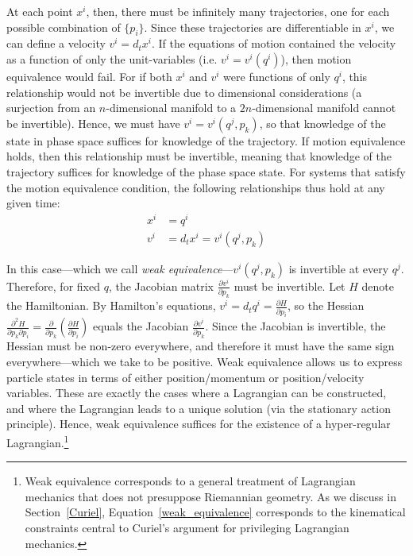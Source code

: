 \documentclass[12pt, english, twoside]{article} %
\begin{document}
At each point $x^i$, then, there must be infinitely many trajectories, one for each possible combination of $\{p_i\}$. Since these trajectories are differentiable in $x^i$, we can define a velocity $v^i = d_t x^i$. If the equations of motion contained the velocity as a function of only the unit-variables (i.e. $v^i=v^i(q^i)$), then motion equivalence would fail. For if both $x^i$ and $v^i$ were functions of only $q^i$, this relationship would not be invertible due to dimensional considerations (a surjection from an $n$-dimensional manifold to a $2n$-dimensional manifold cannot be invertible). Hence, we must have $v^i=v^i(q^j, p_k)$, so that knowledge of the state in phase space suffices for knowledge of the trajectory. If motion equivalence holds, then this relationship must be invertible, meaning that knowledge of the trajectory suffices for knowledge of the phase space state. For systems that satisfy the motion equivalence condition, the following relationships thus hold at any given time:
\begin{equation}\label{weak_equivalence}
\begin{aligned}
x^i &= q^i \\
v^i &= d_t x^i = v^i(q^j, p_k)
\end{aligned}
\end{equation}

In this case---which we call \textit{weak equivalence}---$v^i(q^j, p_k)$ is invertible at every $q^j$. Therefore, for fixed $q$, the Jacobian matrix  $\frac{\partial v^i}{\partial p_k}$ must be invertible. Let $H$ denote the Hamiltonian. By Hamilton's equations, $v^i = d_t q^i = \frac{\partial H}{\partial p_i}$, so the Hessian $\frac{\partial^2 H}{\partial p_k \partial p_i} = \frac{\partial}{\partial p_k} (\frac{\partial H}{\partial p_i})$ equals the Jacobian $\frac{\partial v^i}{\partial p_k}$. Since the Jacobian is invertible, the Hessian must be non-zero everywhere, and therefore it must have the same sign everywhere---which we take to be positive. Weak equivalence allows us to express particle states in terms of either position/momentum or position/velocity variables. These are exactly the cases where a Lagrangian can be constructed, and where the Lagrangian leads to a unique solution (via the stationary action principle). Hence, weak equivalence suffices for the existence of a hyper-regular Lagrangian.\footnote{Weak equivalence corresponds to a general treatment of Lagrangian mechanics that does not presuppose Riemannian geometry. As we discuss in Section~\ref{Curiel}, Equation~\ref{weak_equivalence} corresponds to the kinematical constraints central to Curiel's \parencites*[]{Curiel} argument for privileging Lagrangian mechanics.}
\end{document}
